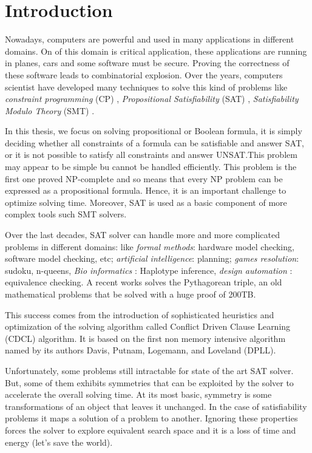 \chapter{Introduction}\label{chap:intro}


Nowadays, computers are powerful and used in many applications in different domains.
On of this domain is critical application, these applications are running in planes, cars
and some software must be secure. Proving the correctness of these software leads
to combinatorial explosion.
Over the years, computers scientist have developed many techniques to solve 
this kind of problems like \emph{constraint programming} (CP) \cite{rossi2006handbook},
\emph{Propositional Satisfiability} (SAT) \cite{biere2009handbook},
\emph{Satisfiability Modulo Theory} (SMT) \cite{barrett2018satisfiability}.

In this thesis, we focus on solving propositional or Boolean formula, it is simply deciding whether 
all constraints of a formula can be satisfiable and answer SAT, or it is not possible to satisfy all
constraints and answer UNSAT.This problem may appear to be simple bu cannot be handled efficiently.
This problem is the first one proved NP-complete and so means that every NP problem can be 
expressed as a propositional formula. Hence, it is an important challenge to optimize solving time.
Moreover, SAT is used as a basic component of more complex tools such SMT solvers.

Over the last decades, SAT solver can handle more and more complicated problems in different domains:
like \emph{formal methods}: hardware model checking,
software model checking, etc; \emph{artificial intelligence}: planning; \emph{games resolution}:
sudoku, n-queens, \emph{Bio informatics} : Haplotype inference,
\emph{design automation} : equivalence checking.
A recent works solves the Pythagorean triple, an old mathematical problems that be solved with a
huge proof of 200TB.
 
This success comes from the introduction of sophisticated heuristics and optimization of the solving 
algorithm called Conflict Driven Clause Learning (CDCL) algorithm. It is based on the first non memory
intensive algorithm named by its authors Davis, Putnam, Logemann, and Loveland (DPLL).

Unfortunately, some problems still intractable for state of the art SAT solver. But, some 
of them exhibits symmetries that can be exploited by the solver to accelerate the overall solving time.
At its most basic, symmetry is some transformations of an object that leaves it  unchanged.
In the case of satisfiability problems it maps a solution of a problem to another.
Ignoring these properties forces the solver to explore equivalent search space and it is a loss of
time and energy (let's save the world). 

